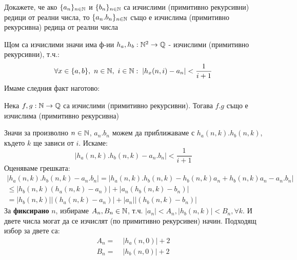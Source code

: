 \begin{problem}
    Докажете, че ако $\{a_n\}_{n\in{\mathbb{N}}}$ и $\{b_n\}_{n\in{\mathbb{N}}}$ са изчислими (примитивно рекурсивни) редици от реални числа, то $\{a_n.b_n\}_{n\in{\mathbb{N}}}$ също е изчислима (примитивно рекурсивна) редица от реални числа
\end{problem}
\begin{solution}
    Щом са изчислими значи има ф-ии $h_a, h_b : {\mathbb{N}}^2 \to {\mathbb{Q}}$ - изчислими (примитивно рекурсивни), т.ч.:
    \begin{equation}
        \forall x \in \{a,b\},\ n\in{\mathbb{N}},\ i\in{\mathbb{N}}:\; \left| h_x(n, i) - a_n\right| < \frac{1}{i+1}
    \end{equation}
    Имаме следния факт наготово:
    \begin{fact}
        Нека $f,g: {\mathbb{N}} \to {\mathbb{Q}}$ са изчислими (примитивно рекурсивни). Тогава $f.g$ също е изчислима (примитивно рекурсивна)
    \end{fact}

    Значи за произволно $n\in{\mathbb{N}}$, $a_n.b_n$ можем да приближаваме с $h_a(n, k).h_b(n, k)$, където $k$ ще зависи от $i$. Искаме:
    \begin{equation}
        \left|h_a(n, k).h_b(n, k) - a_n.b_n\right| < \frac{1}{i+1}
    \end{equation}
    Оценяваме грешката:
    \begin{equation}
        \begin{split}
            \left|h_a(n, k).h_b(n, k) - a_n.b_n\right| = \left|h_a(n, k).h_b(n, k) - h_b(n,k)a_n + h_b(n,k)a_n - a_n.b_n\right| \\
            \leq \left|h_b(n, k)(h_a(n,k) - a_n) \right| + \left|a_n(h_b(n,k) - b_n)\right| \\
            = \left|h_b(n, k)\right|\left|(h_a(n,k) - a_n) \right| + \left|a_n\right|\left|(h_b(n,k) - b_n)\right|
        \end{split}
    \end{equation}
    За \textbf{фиксирано} $n$, избираме $A_n, B_n\in {\mathbb{N}}$, т.ч. $|a_n| < A_n, |h_b(n, k)| < B_n, \forall k$. И двете числа могат да се изчислят (по примитивно рекурсивен) начин. Подходящ избор за двете са:
    \begin{equation}
        \begin{split}
            A_n = &\; |h_a(n, 0)| + 2 \\
            B_n = &\; |h_b(n, 0)| + 2 
        \end{split}
    \end{equation}


\end{solution}
